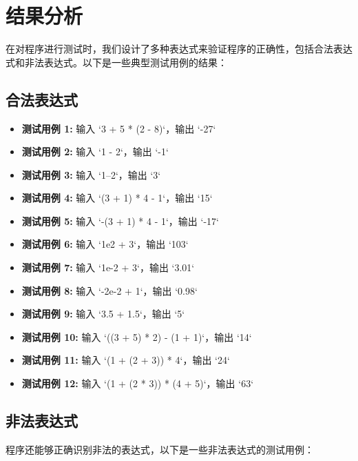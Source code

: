 \documentclass{article}
\begin{document}
\section{结果分析}

在对程序进行测试时，我们设计了多种表达式来验证程序的正确性，包括合法表达式和非法表达式。以下是一些典型测试用例的结果：

\subsection{合法表达式}

\begin{itemize}
    \item \textbf{测试用例 1:} 输入 `3 + 5 * (2 - 8)`，输出 `-27`
    \item \textbf{测试用例 2:} 输入 `1 - 2`，输出 `-1`
    \item \textbf{测试用例 3:} 输入 `1--2`，输出 `3`
    \item \textbf{测试用例 4:} 输入 `(3 + 1) * 4 - 1`，输出 `15`
    \item \textbf{测试用例 5:} 输入 `-(3 + 1) * 4 - 1`，输出 `-17`
    \item \textbf{测试用例 6:} 输入 `1e2 + 3`，输出 `103`
    \item \textbf{测试用例 7:} 输入 `1e-2 + 3`，输出 `3.01`
    \item \textbf{测试用例 8:} 输入 `-2e-2 + 1`，输出 `0.98`
    \item \textbf{测试用例 9:} 输入 `3.5 + 1.5`，输出 `5`
    \item \textbf{测试用例 10:} 输入 `((3 + 5) * 2) - (1 + 1)`，输出 `14`
    \item \textbf{测试用例 11:} 输入 `(1 + (2 + 3)) * 4`，输出 `24`
    \item \textbf{测试用例 12:} 输入 `(1 + (2 * 3)) * (4 + 5)`，输出 `63`
\end{itemize}

\subsection{非法表达式}

程序还能够正确识别非法的表达式，以下是一些非法表达式的测试用例：
\end{document}

